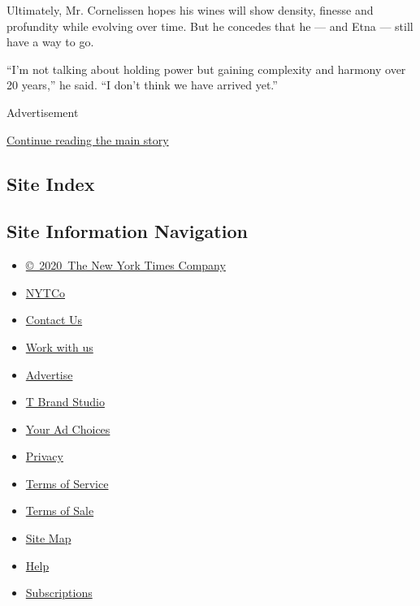 Ultimately, Mr. Cornelissen hopes his wines will show density, finesse
and profundity while evolving over time. But he concedes that he --- and
Etna --- still have a way to go.

``I'm not talking about holding power but gaining complexity and harmony
over 20 years,'' he said. ``I don't think we have arrived yet.''

Advertisement

\protect\hyperlink{after-bottom}{Continue reading the main story}

\hypertarget{site-index}{%
\subsection{Site Index}\label{site-index}}

\hypertarget{site-information-navigation}{%
\subsection{Site Information
Navigation}\label{site-information-navigation}}

\begin{itemize}
\tightlist
\item
  \href{https://help.nytimes3xbfgragh.onion/hc/en-us/articles/115014792127-Copyright-notice}{©~2020~The
  New York Times Company}
\end{itemize}

\begin{itemize}
\tightlist
\item
  \href{https://www.nytco.com/}{NYTCo}
\item
  \href{https://help.nytimes3xbfgragh.onion/hc/en-us/articles/115015385887-Contact-Us}{Contact
  Us}
\item
  \href{https://www.nytco.com/careers/}{Work with us}
\item
  \href{https://nytmediakit.com/}{Advertise}
\item
  \href{http://www.tbrandstudio.com/}{T Brand Studio}
\item
  \href{https://www.nytimes3xbfgragh.onion/privacy/cookie-policy\#how-do-i-manage-trackers}{Your
  Ad Choices}
\item
  \href{https://www.nytimes3xbfgragh.onion/privacy}{Privacy}
\item
  \href{https://help.nytimes3xbfgragh.onion/hc/en-us/articles/115014893428-Terms-of-service}{Terms
  of Service}
\item
  \href{https://help.nytimes3xbfgragh.onion/hc/en-us/articles/115014893968-Terms-of-sale}{Terms
  of Sale}
\item
  \href{https://spiderbites.nytimes3xbfgragh.onion}{Site Map}
\item
  \href{https://help.nytimes3xbfgragh.onion/hc/en-us}{Help}
\item
  \href{https://www.nytimes3xbfgragh.onion/subscription?campaignId=37WXW}{Subscriptions}
\end{itemize}

